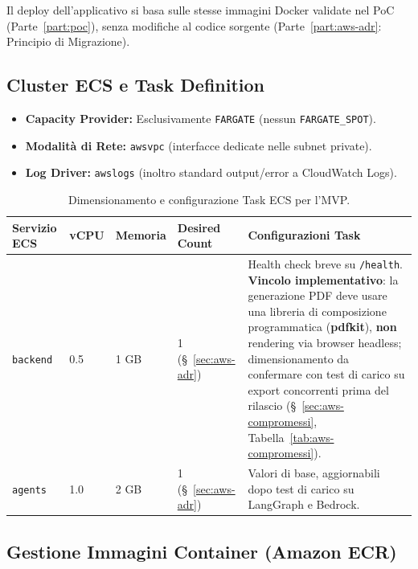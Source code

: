 \documentclass[11pt,a4paper]{article}
\begin{document}
Il deploy dell'applicativo si basa sulle stesse immagini Docker validate nel PoC (Parte~\ref{part:poc}), senza modifiche al codice sorgente (Parte~\ref{part:aws-adr}: Principio di Migrazione).

\subsection{Cluster ECS e Task Definition}

\begin{itemize}
    \item \textbf{Capacity Provider:} Esclusivamente \texttt{FARGATE} (nessun \texttt{FARGATE\_SPOT}).
    \item \textbf{Modalità di Rete:} \texttt{awsvpc} (interfacce dedicate nelle subnet private).
    \item \textbf{Log Driver:} \texttt{awslogs} (inoltro standard output/error a CloudWatch Logs).
\end{itemize}

\begin{table}[H]
\centering
\caption{Dimensionamento e configurazione Task ECS per l'MVP.}
\label{tab:aws-ecs}
\vspace{2mm}
\renewcommand{\arraystretch}{1.2}
\begin{tabularx}{\textwidth}{|l|l|l|l|X|}
\hline
\textbf{Servizio ECS} & \textbf{vCPU} & \textbf{Memoria} & \textbf{Desired Count} & \textbf{Configurazioni Task} \\ \hline
\texttt{backend} & 0.5 & 1 GB & 1 (\S~\ref{sec:aws-adr}) & Health check breve su \texttt{/health}. \textbf{Vincolo implementativo}: la generazione PDF deve usare una libreria di composizione programmatica (\textbf{pdfkit}), \textbf{non} rendering via browser headless; dimensionamento da confermare con test di carico su export concorrenti prima del rilascio (\S~\ref{sec:aws-compromessi}, Tabella~\ref{tab:aws-compromessi}). \\ \hline
\texttt{agents} & 1.0 & 2 GB & 1 (\S~\ref{sec:aws-adr}) & Valori di base, aggiornabili dopo test di carico su LangGraph e Bedrock. \\ \hline
\end{tabularx}
\end{table}

\subsection{Gestione Immagini Container (Amazon ECR)}
\end{document}
